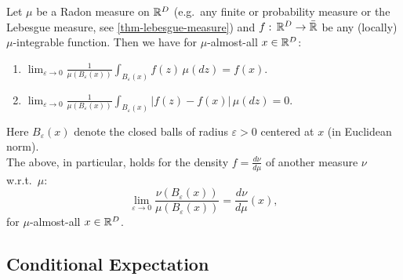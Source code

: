 \begin{Thm}
    \label{besicovitch-density}
Let $\mu$ be a Radon measure on $\mathbb{R}^D$ (e.g.\ any finite or probability measure or the Lebesgue measure, see \ref{thm-lebesgue-measure}) and $f:\,\mathbb{R}^D \to \bar{\mathbb{R}}$ be any (locally) $\mu$-integrable function.
    Then we have for $\mu$-almost-all $x \in \mathbb{R}^D$:
    \begin{enumerate}
        \item $\displaystyle \lim_{\varepsilon \to 0} \frac{1}{\mu( B_\varepsilon(x))} \int_{B_\varepsilon(x)}f(z)\,\mu(dz) = f(x).$   
        \item $\displaystyle \lim_{\varepsilon \to 0} \frac{1}{\mu( B_\varepsilon(x))} \int_{B_\varepsilon(x)}|f(z) - f(x)|\,\mu(dz) = 0$. 
    \end{enumerate}
    Here $B_\varepsilon(x)$ denote the closed balls of radius $\varepsilon>0$ centered at $x$ (in Euclidean norm).\\
    The above, in particular, holds for the density $f=\frac{d\nu}{d\mu}$ of another measure $\nu$ w.r.t.\ $\mu$:
    \[  \lim_{\varepsilon \to 0} \frac{\nu( B_\varepsilon(x))} {\mu( B_\varepsilon(x))}  = \frac{d\nu}{d\mu}(x), \]
    for $\mu$-almost-all $x \in \mathbb{R}^D$.
\end{Thm}

\subsection{Conditional Expectation}

